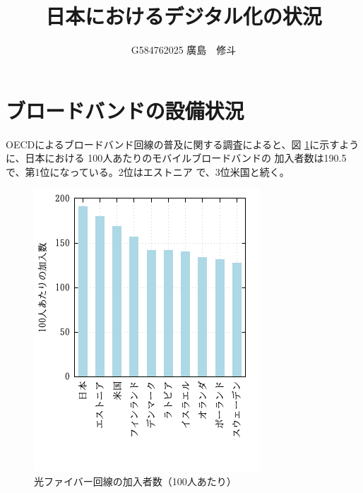 \documentclass[a4paper,11pt,dvipdfmx]{ujarticle}
\title{日本におけるデジタル化の状況}
\author{G584762025 廣島　修斗}
\begin{document}
\maketitle %

\section{ブロードバンドの設備状況}
OECDによるブロードバンド回線の普及に関する調査\cite{oecd}によると、図
\ref{1}に示すように、日本における 100人あたりのモバイルブロードバンドの
加入者数は190.5で、第1位になっている。2位はエストニア
で、3位米国と続く。
\begin{figure}[htbp]
    \centering
    \includegraphics{fig21.png}
    \caption{光ファイバー回線の加入者数（100人あたり）}
    \label{1}
\end{figure}
\end{document}
